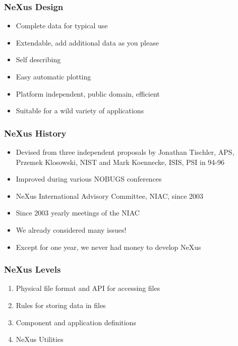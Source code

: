 \documentclass{beamer}
\begin{document}
\begin{frame} \frametitle{NeXus Design}
\begin{itemize}
\item Complete data for typical use
\item Extendable, add additional data as you please
\item Self describing
\item Easy automatic plotting
\item Platform independent, public domain, efficient
\item Suitable for a wild variety of applications
\end{itemize}
\end{frame}

\begin{frame} \frametitle{NeXus History }
\begin{itemize}
\item Devised from three independent proposals by Jonathan Tischler, 
  APS, Przemek Klosowski, NIST and 
 Mark Koennecke, ISIS, PSI in 94-96
\item Improved during various NOBUGS conferences
\item NeXus International Advisory Committee, NIAC, since 2003
\item Since 2003 yearly meetings of the NIAC
\item We already considered many issues!
\item Except for one year, we never had money to develop NeXus
\end{itemize}
\end{frame}

\begin{frame}
 \frametitle{NeXus Levels }
\begin{enumerate}
\item Physical file format and API for accessing files
\item Rules for storing data in files
\item Component and application definitions
\item NeXus Utilities
\end{enumerate}
\end{frame}
\end{document}

